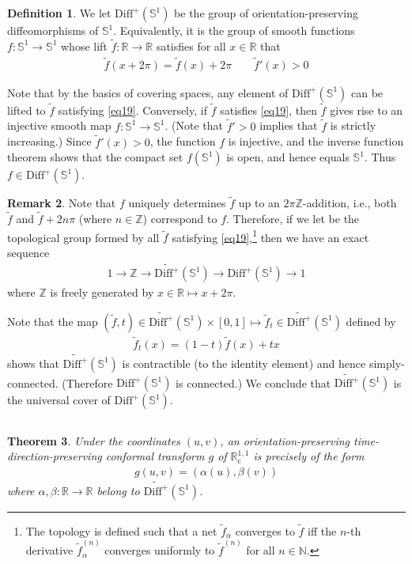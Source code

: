 \documentclass[12pt,b5paper,notitlepage]{article}
\theoremstyle{definition}
\newtheorem{df}{Definition}[section]
\newtheorem{rem}[df]{Remark}
\theoremstyle{plain}
\newtheorem{thm}[df]{Theorem}
\newcommand{\wtd}{\widetilde}
\newcommand{\Diffp}{\mathrm{Diff}^+}
\newcommand{\Nbb}{\mathbb N}
\newcommand{\Zbb}{\mathbb Z}
\newcommand{\Rbb}{\mathbb R}
\newcommand{\Sbb}{{\mathbb S}}
\newcommand{\Rc}{\mathbb R^{1,1}_{\mathrm{c}}}
\newcommand{\DiffS}{\mathrm{Diff}^+(\mathbb S^1)}
\newcommand{\WDS}{\widetilde{\mathrm{Diff}^+}(\mathbb S^1)}
\numberwithin{equation}{section}
\begin{document}
\begin{df}
We let $\Diffp(\Sbb^1)$ \index{Diff@$\Diffp(\Sbb^1)$} be the group of orientation-preserving diffeomorphisms of $\Sbb^1$. Equivalently, it is the group of smooth functions $f:\Sbb^1\rightarrow\Sbb^1$ whose lift $\wtd f:\Rbb\rightarrow\Rbb$ satisfies for all $x\in\Rbb$ that
\begin{gather}\label{eq19}
\wtd f(x+2\pi)=\wtd f(x)+2\pi\qquad \wtd f'(x)>0
\end{gather}
\end{df}

Note that by the basics of covering spaces, any element of $\Diffp(\Sbb^1)$ can be lifted to $\wtd f$ satisfying \eqref{eq19}. Conversely, if $\wtd f$ satisfies \eqref{eq19}, then $\wtd f$ gives rise to an injective smooth map $f:\Sbb^1\rightarrow\Sbb^1$. (Note that $\wtd f'>0$ implies that $\wtd f$ is strictly increasing.) Since $\wtd f'(x)>0$, the function $f$ is injective, and the inverse function theorem shows that the compact set $f(\Sbb^1)$ is open, and hence equals $\Sbb^1$. Thus $f\in\Diffp(\Sbb^1)$.


\begin{rem}
Note that $f$ uniquely determines $\wtd f$ up to an $2\pi\Zbb$-addition, i.e., both $\wtd f$ and $\wtd f+2n\pi$ (where $n\in\Zbb$) correspond to $f$. Therefore, if we let \pmb{$\WDS$} \index{DiffS@$\WDS$} be the topological group formed by all $\wtd f$ satisfying \eqref{eq19},\footnote{The topology is defined such that a net $\wtd f_\alpha$ converges to $\wtd f$ iff the $n$-th derivative $\wtd f_\alpha^{(n)}$ converges uniformly to $\wtd f^{(n)}$ for all $n\in\Nbb$.} then we have an exact sequence
\begin{align}\label{eq26}
1\longrightarrow \Zbb\longrightarrow \WDS\longrightarrow\DiffS\longrightarrow 1
\end{align}
where $\Zbb$ is freely generated by $x\in\Rbb\mapsto x+2\pi$. 

Note that the map $(\wtd f,t)\in\WDS\times[0,1]\mapsto \wtd f_t\in\WDS$ defined by
\begin{align*}
\wtd f_t(x)=(1-t)\wtd f(x)+tx
\end{align*}
shows that $\WDS$ is contractible (to the identity element) and hence simply-connected. (Therefore $\DiffS$ is connected.) We conclude that $\WDS$ is the universal cover of $\DiffS$. \hfill\qedsymbol
\end{rem}



\subsection{}
\begin{thm}\label{lb13}
Under the coordinates $(u,v)$, an orientation-preserving time-direction-preserving conformal transform $g$ of $\Rc$ is precisely of the form 
\begin{align}\label{eq20}
g(u,v)=(\alpha(u),\beta(v))
\end{align}
where $\alpha,\beta:\Rbb\rightarrow\Rbb$ belong to $\WDS$.
\end{thm}
\end{document}
